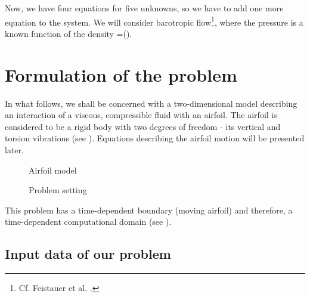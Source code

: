 Now, we have four equations for five unknowns, so we have to add one more equation to the system.
We will consider barotropic flow\footnote{Cf. Feistauer et al. \cite[p. 33]{feistauer}.}, 
where the pressure is a known function of the density
{
\pi=\widehat\pi(\rho).
}

\chapter{Formulation of the problem}

In what follows, we shall be concerned with a two-dimensional model describing an interaction 
of a viscous, compressible fluid with an airfoil. The airfoil is considered to be a rigid body 
with two degrees of freedom - its vertical and torsion vibrations (see ). 
Equations describing the airfoil motion will be presented later.

\begin{figure}[h]
  \begin{center}
    \caption{Airfoil model}
    \label{si-im-airfoil}
  \end{center}
\end{figure}

\begin{figure}[h]
  \begin{center}
    \caption{Problem setting}
    \label{si-im-setting}
  \end{center}
\end{figure}

This problem has a time-dependent boundary (moving airfoil) and therefore, a time-dependent
computational domain (see ).

\section{Input data of our problem}

